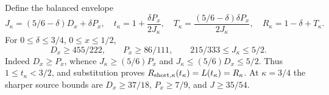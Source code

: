 Define the balanced envelope
\begin{equation}\label{eq:balanced}
 J_\kappa=(5/6-\delta)D_x+\delta P_x,\quad
 t_\kappa=1+\frac{\delta P_x}{2J_\kappa},\quad
 T_\kappa=\frac{(5/6-\delta)\delta P_x}{2J_\kappa},\quad
 R_\kappa=1-\delta+T_\kappa.
\end{equation}
For $0\le\delta\le3/4$, $0\le x\le1/2$,
\[
 D_x\ge455/222,\qquad P_x\ge86/111,\qquad
 215/333\le J_\kappa\le5/2.
\]
Indeed $D_x\ge P_x$, whence $J_\kappa\ge(5/6)P_x$ and $J_\kappa\le(5/6)D_x\le5/2$. Thus $1\le t_\kappa<3/2$, and substitution proves $R_{{\rm short},\kappa}(t_\kappa)=L(t_\kappa)=R_\kappa$. At $\kappa=3/4$ the sharper source bounds are $D_x\ge37/18$, $P_x\ge7/9$, and $J\ge35/54$.
